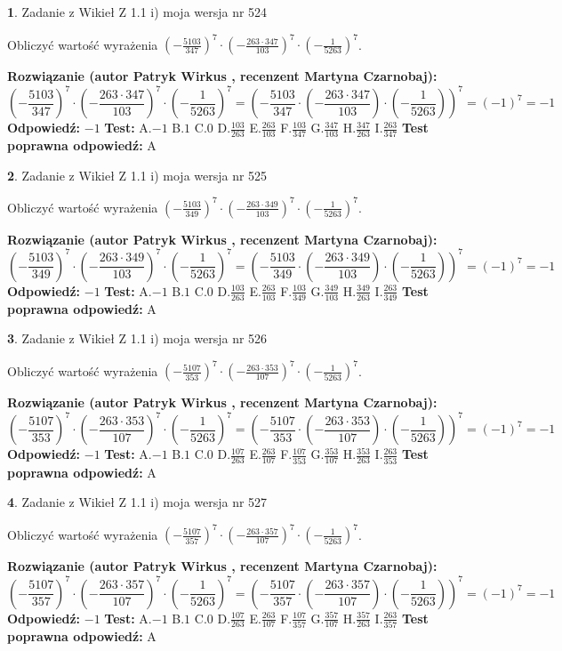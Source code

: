 \documentclass[12pt, a4paper]{article}
\theoremstyle{definition} %
\newtheorem{zad}{}
\newcommand{\zadStart}[1]{\begin{zad}#1\newline}
\newcommand{\zadStop}{\end{zad}}
\newcommand{\rozwStart}[2]{\noindent \textbf{Rozwiązanie (autor #1 , recenzent #2): }\newline}
\newcommand{\rozwStop}{\newline}
\newcommand{\odpStart}{\noindent \textbf{Odpowiedź:}\newline}
\newcommand{\odpStop}{\newline}
\newcommand{\testStart}{\noindent \textbf{Test:}\newline}
\newcommand{\testStop}{\newline}
\newcommand{\kluczStart}{\noindent \textbf{Test poprawna odpowiedź:}\newline}
\newcommand{\kluczStop}{\newline}
\begin{document}
\zadStart{Zadanie z Wikieł Z 1.1 i) moja wersja nr 524}

Obliczyć wartość wyrażenia $(-\frac{5103}{347})^{7} \cdot (-\frac{263 \cdot 347}{103})^{7} \cdot (-\frac{1}{5263})^{7}$.
\zadStop
\rozwStart{Patryk Wirkus}{Martyna Czarnobaj}
$$(-\frac{5103}{347})^{7} \cdot (-\frac{263 \cdot 347}{103})^{7} \cdot (-\frac{1}{5263})^{7} = (-\frac{5103}{347} \cdot (-\frac{263 \cdot 347}{103}) \cdot (-\frac{1}{5263}))^{7} = (-1)^{7} = -1$$
\rozwStop
\odpStart
$-1$
\odpStop
\testStart
A.$-1$ B.$1$ C.$0$ D.$\frac{103}{263}$ E.$\frac{263}{103}$
F.$\frac{103}{347}$ G.$\frac{347}{103}$
H.$\frac{347}{263}$
I.$\frac{263}{347}$
\testStop
\kluczStart
A
\kluczStop



\zadStart{Zadanie z Wikieł Z 1.1 i) moja wersja nr 525}

Obliczyć wartość wyrażenia $(-\frac{5103}{349})^{7} \cdot (-\frac{263 \cdot 349}{103})^{7} \cdot (-\frac{1}{5263})^{7}$.
\zadStop
\rozwStart{Patryk Wirkus}{Martyna Czarnobaj}
$$(-\frac{5103}{349})^{7} \cdot (-\frac{263 \cdot 349}{103})^{7} \cdot (-\frac{1}{5263})^{7} = (-\frac{5103}{349} \cdot (-\frac{263 \cdot 349}{103}) \cdot (-\frac{1}{5263}))^{7} = (-1)^{7} = -1$$
\rozwStop
\odpStart
$-1$
\odpStop
\testStart
A.$-1$ B.$1$ C.$0$ D.$\frac{103}{263}$ E.$\frac{263}{103}$
F.$\frac{103}{349}$ G.$\frac{349}{103}$
H.$\frac{349}{263}$
I.$\frac{263}{349}$
\testStop
\kluczStart
A
\kluczStop



\zadStart{Zadanie z Wikieł Z 1.1 i) moja wersja nr 526}

Obliczyć wartość wyrażenia $(-\frac{5107}{353})^{7} \cdot (-\frac{263 \cdot 353}{107})^{7} \cdot (-\frac{1}{5263})^{7}$.
\zadStop
\rozwStart{Patryk Wirkus}{Martyna Czarnobaj}
$$(-\frac{5107}{353})^{7} \cdot (-\frac{263 \cdot 353}{107})^{7} \cdot (-\frac{1}{5263})^{7} = (-\frac{5107}{353} \cdot (-\frac{263 \cdot 353}{107}) \cdot (-\frac{1}{5263}))^{7} = (-1)^{7} = -1$$
\rozwStop
\odpStart
$-1$
\odpStop
\testStart
A.$-1$ B.$1$ C.$0$ D.$\frac{107}{263}$ E.$\frac{263}{107}$
F.$\frac{107}{353}$ G.$\frac{353}{107}$
H.$\frac{353}{263}$
I.$\frac{263}{353}$
\testStop
\kluczStart
A
\kluczStop



\zadStart{Zadanie z Wikieł Z 1.1 i) moja wersja nr 527}

Obliczyć wartość wyrażenia $(-\frac{5107}{357})^{7} \cdot (-\frac{263 \cdot 357}{107})^{7} \cdot (-\frac{1}{5263})^{7}$.
\zadStop
\rozwStart{Patryk Wirkus}{Martyna Czarnobaj}
$$(-\frac{5107}{357})^{7} \cdot (-\frac{263 \cdot 357}{107})^{7} \cdot (-\frac{1}{5263})^{7} = (-\frac{5107}{357} \cdot (-\frac{263 \cdot 357}{107}) \cdot (-\frac{1}{5263}))^{7} = (-1)^{7} = -1$$
\rozwStop
\odpStart
$-1$
\odpStop
\testStart
A.$-1$ B.$1$ C.$0$ D.$\frac{107}{263}$ E.$\frac{263}{107}$
F.$\frac{107}{357}$ G.$\frac{357}{107}$
H.$\frac{357}{263}$
I.$\frac{263}{357}$
\testStop
\kluczStart
A
\kluczStop
\end{document}
